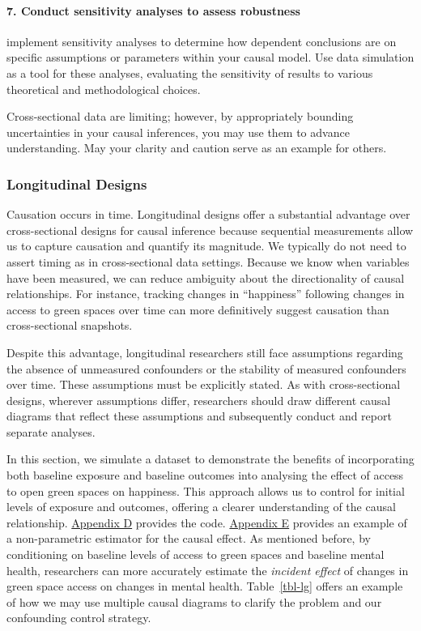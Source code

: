 \documentclass[
  single column]{article}
\let\oldparagraph\paragraph
\renewcommand{\paragraph}[1]{\oldparagraph{#1}\mbox{}}
\begin{document}
\paragraph{\texorpdfstring{7. \textbf{Conduct sensitivity analyses to
assess
robustness}}{7. Conduct sensitivity analyses to assess robustness}}\label{conduct-sensitivity-analyses-to-assess-robustness}

implement sensitivity analyses to determine how dependent conclusions
are on specific assumptions or parameters within your causal model. Use
data simulation as a tool for these analyses, evaluating the sensitivity
of results to various theoretical and methodological choices.

Cross-sectional data are limiting; however, by appropriately bounding
uncertainties in your causal inferences, you may use them to advance
understanding. May your clarity and caution serve as an example for
others.

\subsubsection{Longitudinal Designs}\label{longitudinal-designs}

Causation occurs in time. Longitudinal designs offer a substantial
advantage over cross-sectional designs for causal inference because
sequential measurements allow us to capture causation and quantify its
magnitude. We typically do not need to assert timing as in
cross-sectional data settings. Because we know when variables have been
measured, we can reduce ambiguity about the directionality of causal
relationships. For instance, tracking changes in ``happiness'' following
changes in access to green spaces over time can more definitively
suggest causation than cross-sectional snapshots.

Despite this advantage, longitudinal researchers still face assumptions
regarding the absence of unmeasured confounders or the stability of
measured confounders over time. These assumptions must be explicitly
stated. As with cross-sectional designs, wherever assumptions differ,
researchers should draw different causal diagrams that reflect these
assumptions and subsequently conduct and report separate analyses.

In this section, we simulate a dataset to demonstrate the benefits of
incorporating both baseline exposure and baseline outcomes into
analysing the effect of access to open green spaces on happiness. This
approach allows us to control for initial levels of exposure and
outcomes, offering a clearer understanding of the causal relationship.
\hyperref[appendix-d-simulation-of-different-confounding-control-strategies]{Appendix
D} provides the code.
\hyperref[appendix-e-non-parametric-estimation-of-average-treatment-effects-using-causal-forests]{Appendix
E} provides an example of a non-parametric estimator for the causal
effect. As mentioned before, by conditioning on baseline levels of
access to green spaces and baseline mental health, researchers can more
accurately estimate the \emph{incident effect} of changes in green space
access on changes in mental health. Table~\ref{tbl-lg} offers an example
of how we may use multiple causal diagrams to clarify the problem and
our confounding control strategy.
\end{document}
